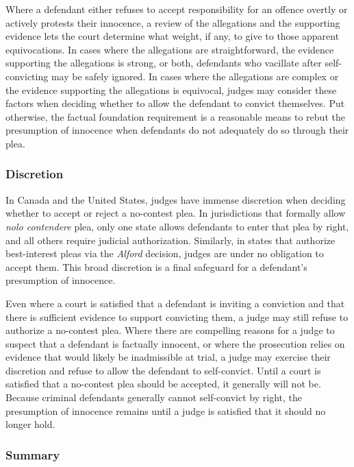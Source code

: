 Where a defendant either refuses to accept responsibility for an offence overtly or actively protests their innocence, a review of the allegations and the supporting evidence lets the court determine what weight, if any, to give to those apparent equivocations. In cases where the allegations are straightforward, the evidence supporting the allegations is strong, or both, defendants who vacillate after self-convicting may be safely ignored. In cases where the allegations are complex or the evidence supporting the allegations is equivocal, judges may consider these factors when deciding whether to allow the defendant to convict themselves. Put otherwise, the factual foundation requirement is a reasonable means to rebut the presumption of innocence when defendants do not adequately do so through their plea.

\subsubsection{Discretion}

In Canada and the United States, judges have immense discretion when deciding whether to accept or reject a no-contest plea. In jurisdictions that formally allow \textit{nolo contendere} plea, only one state allows defendants to enter that plea by right, and all others require judicial authorization. Similarly, in states that authorize best-interest pleas via the \textit{Alford} decision, judges are under no obligation to accept them. This broad discretion is a final safeguard for a defendant's presumption of innocence.

Even where a court is satisfied that a defendant is inviting a conviction and that there is sufficient evidence to support convicting them, a judge may still refuse to authorize a no-contest plea. Where there are compelling reasons for a judge to suspect that a defendant is factually innocent, or where the prosecution relies on evidence that would likely be inadmissible at trial, a judge may exercise their discretion and refuse to allow the defendant to self-convict. Until a court is satisfied that a no-contest plea should be accepted, it generally will not be. Because criminal defendants generally cannot self-convict by right, the presumption of innocence remains until a judge is satisfied that it should no longer hold.

\subsubsection{Summary}

